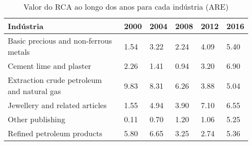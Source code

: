 \begin{table}
\centering
\caption{Valor do RCA ao longo dos anos para cada indústria (ARE)}
\label{tab:ex3-tempo-ARE}
\begin{tabular}{p{6cm}p{1.5cm}p{1.5cm}p{1.5cm}p{1.5cm}p{1.5cm}}
\toprule
                                 Indústria & 2000 & 2004 & 2008 & 2012 & 2016 \\
\midrule
     Basic precious and non-ferrous metals & 1.54 & 3.22 & 2.24 & 4.09 & 5.40 \\
                   Cement lime and plaster & 2.26 & 1.41 & 0.94 & 3.20 & 6.90 \\
Extraction crude petroleum and natural gas & 9.83 & 8.31 & 6.26 & 3.88 & 5.04 \\
            Jewellery and related articles & 1.55 & 4.94 & 3.90 & 7.10 & 6.55 \\
                          Other publishing & 0.11 & 0.70 & 1.20 & 1.06 & 5.25 \\
                Refined petroleum products & 5.80 & 6.65 & 3.25 & 2.74 & 5.36 \\
\bottomrule
\end{tabular}
\end{table}
